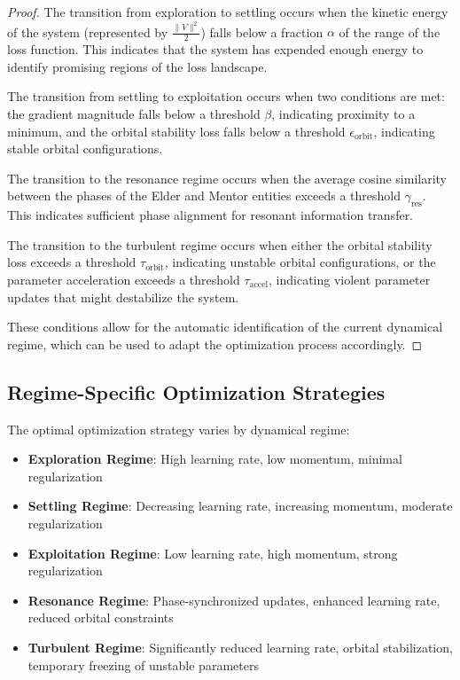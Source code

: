 \begin{proof}
The transition from exploration to settling occurs when the kinetic energy of the system (represented by $\frac{\|V\|^2}{2}$) falls below a fraction $\alpha$ of the range of the loss function. This indicates that the system has expended enough energy to identify promising regions of the loss landscape.

The transition from settling to exploitation occurs when two conditions are met: the gradient magnitude falls below a threshold $\beta$, indicating proximity to a minimum, and the orbital stability loss falls below a threshold $\epsilon_{\text{orbit}}$, indicating stable orbital configurations.

The transition to the resonance regime occurs when the average cosine similarity between the phases of the Elder and Mentor entities exceeds a threshold $\gamma_{\text{res}}$. This indicates sufficient phase alignment for resonant information transfer.

The transition to the turbulent regime occurs when either the orbital stability loss exceeds a threshold $\tau_{\text{orbit}}$, indicating unstable orbital configurations, or the parameter acceleration exceeds a threshold $\tau_{\text{accel}}$, indicating violent parameter updates that might destabilize the system.

These conditions allow for the automatic identification of the current dynamical regime, which can be used to adapt the optimization process accordingly.
\end{proof}

\subsection{Regime-Specific Optimization Strategies}

\begin{theorem}
The optimal optimization strategy varies by dynamical regime:
\begin{itemize}
    \item \textbf{Exploration Regime}: High learning rate, low momentum, minimal regularization
    \item \textbf{Settling Regime}: Decreasing learning rate, increasing momentum, moderate regularization
    \item \textbf{Exploitation Regime}: Low learning rate, high momentum, strong regularization
    \item \textbf{Resonance Regime}: Phase-synchronized updates, enhanced learning rate, reduced orbital constraints
    \item \textbf{Turbulent Regime}: Significantly reduced learning rate, orbital stabilization, temporary freezing of unstable parameters
\end{itemize}
\end{theorem}


